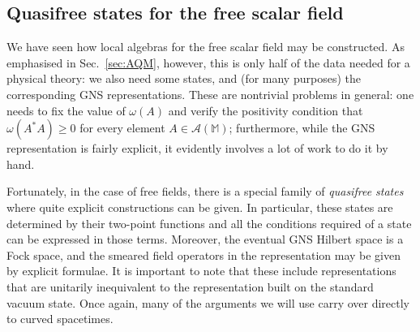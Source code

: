 \documentclass[12pt,a4paper]{article}
\newcommand{\1}{\mathds{1}}                         %
\newcommand{\MM}{\mathbb{M}}
\newcommand{\Ac}{{\mathcal{A}}}
\newcommand{\ip}[2]{\langle #1|#2\rangle}
\newtheorem{exercise}[theorem]{Exercise}
\begin{document}
%

\subsection{Quasifree states for the free scalar field}\label{sec:quasifree} 
 
We have seen how local algebras for the free scalar field may be constructed.  
As emphasised in Sec.~\ref{sec:AQM}, however, this is only half of the data needed for
a physical theory: we also need some states, and (for many purposes) the corresponding 
GNS representations. These are nontrivial problems in general: one needs to fix the value of $\omega(A)$ and verify the positivity
condition that $\omega(A^*A)\ge 0$ for every element $A\in\Ac(\MM)$;
furthermore, while the GNS representation is fairly explicit, it evidently involves a lot of work to do it by hand. 

Fortunately, in the case of free fields, there is a special family of \emph{quasifree states} where quite explicit constructions can be given. In particular, these states are determined by their two-point functions and all the conditions required of a state can be expressed in those terms. Moreover, the eventual GNS Hilbert space is a Fock space, and the smeared field operators in the representation may be given by explicit formulae. It is important to note that these include representations that are unitarily inequivalent to the representation built on the standard vacuum state. Once again, many of the arguments we will use carry over directly to curved spacetimes. 
\end{document}

